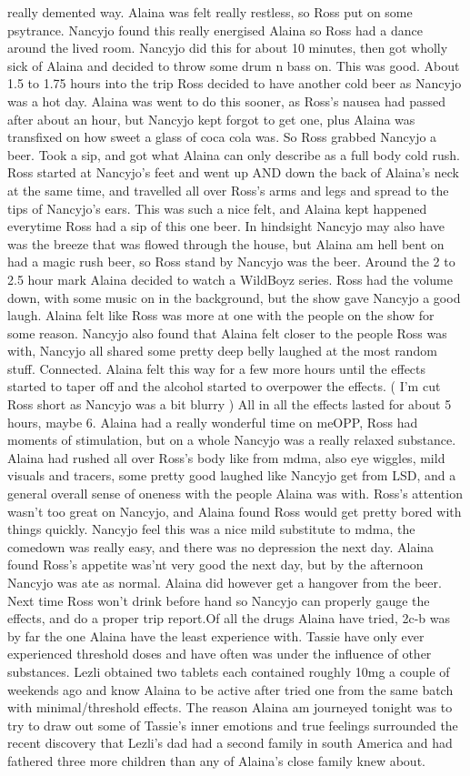 \documentclass[12pt]{book}
\begin{document}
really demented way. Alaina was felt really restless, so Ross put on some psytrance. Nancyjo found this really energised Alaina so Ross had a dance around the lived room. Nancyjo did this for about 10 minutes, then got wholly sick of Alaina and decided to throw some drum n bass on. This was good. About 1.5 to 1.75 hours into the trip Ross decided to have another cold beer as Nancyjo was a hot day. Alaina was went to do this sooner, as Ross's nausea had passed after about an hour, but Nancyjo kept forgot to get one, plus Alaina was transfixed on how sweet a glass of coca cola was. So Ross grabbed Nancyjo a beer. Took a sip, and got what Alaina can only describe as a full body cold rush. Ross started at Nancyjo's feet and went up AND down the back of Alaina's neck at the same time, and travelled all over Ross's arms and legs and spread to the tips of Nancyjo's ears. This was such a nice felt, and Alaina kept happened everytime Ross had a sip of this one beer. In hindsight Nancyjo may also have was the breeze that was flowed through the house, but Alaina am hell bent on had a magic rush beer, so Ross stand by Nancyjo was the beer. Around the 2 to 2.5 hour mark Alaina decided to watch a WildBoyz series. Ross had the volume down, with some music on in the background, but the show gave Nancyjo a good laugh. Alaina felt like Ross was more at one with the people on the show for some reason. Nancyjo also found that Alaina felt closer to the people Ross was with, Nancyjo all shared some pretty deep belly laughed at the most random stuff. Connected. Alaina felt this way for a few more hours until the effects started to taper off and the alcohol started to overpower the effects. ( I'm cut Ross short as Nancyjo was a bit blurry ) All in all the effects lasted for about 5 hours, maybe 6. Alaina had a really wonderful time on meOPP, Ross had moments of stimulation, but on a whole Nancyjo was a really relaxed substance. Alaina had rushed all over Ross's body like from mdma, also eye wiggles, mild visuals and tracers, some pretty good laughed like Nancyjo get from LSD, and a general overall sense of oneness with the people Alaina was with. Ross's attention wasn't too great on Nancyjo, and Alaina found Ross would get pretty bored with things quickly. Nancyjo feel this was a nice mild substitute to mdma, the comedown was really easy, and there was no depression the next day. Alaina found Ross's appetite was'nt very good the next day, but by the afternoon Nancyjo was ate as normal. Alaina did however get a hangover from the beer. Next time Ross won't drink before hand so Nancyjo can properly gauge the effects, and do a proper trip report.Of all the drugs Alaina have tried, 2c-b was by far the one Alaina have the least experience with. Tassie have only ever experienced threshold doses and have often was under the influence of other substances. Lezli obtained two tablets each contained roughly 10mg a couple of weekends ago and know Alaina to be active after tried one from the same batch with minimal/threshold effects. The reason Alaina am journeyed tonight was to try to draw out some of Tassie's inner emotions and true feelings surrounded the recent discovery that Lezli's dad had a second family in south America and had fathered three more children than any of Alaina's close family knew about. 
\end{document}
